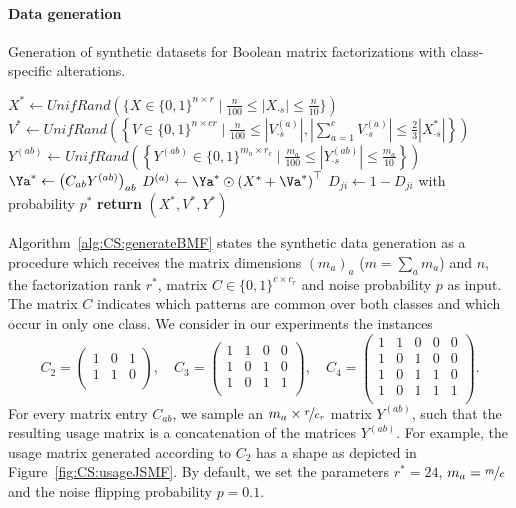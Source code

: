 \paragraph{Data generation}
\begin{algorithm}[t]
\caption{Generation of synthetic datasets for Boolean matrix factorizations with class-specific alterations.}
\begin{algorithmic}[1]
  	\State $X^*\gets UnifRand(\{X\in\{0,1\}^{n\times r}\mid \frac{n}{100}\leq|X_{\cdot s}|\leq \frac{n}{10}\})$
  	\State $\displaystyle V^*\gets UnifRand\left(\left\{V\in\{0,1\}^{n\times cr}\mid \frac{n}{100}\leq\left|V^{(a)}_{\cdot s}\right|, \left|\sum_{a=1}^cV^{(a)}_{\cdot s}\right|\leq \frac{2}{3}|X_{\cdot s}^*|\right\}\right)$
  	    \State ${Y^{(ab)}}\gets UnifRand\left(\left\{{Y^{(ab)}}\in\{0,1\}^{m_a\times r_c}\mid \frac{m_a}{100}\leq|Y^{(ab)}_{\cdot s}|\leq \frac{m_a}{10}\right\}\right)$
  	\EndFor
  	\State ${\Ya}^*\gets \left(C_{ab}Y^{(ab)}\right)_{ab}$
  	\State $D^{(a)}\gets {\Ya}^* \odot \left(X^*+{\Va}^*\right)^\top$ 
  	    \State $D_{ji}\gets 1-D_{ji}$ with probability $p^*$ 
    \EndFor
    \State \textbf{return} $(X^*,V^*,Y^*)$
  \EndFunction
\end{algorithmic}
\label{alg:CS:generateBMF}
\end{algorithm}
Algorithm~\ref{alg:CS:generateBMF} states the synthetic data generation as a procedure which receives the matrix dimensions $(m_a)_a$ ($m=\sum_am_a$) and $n$, the factorization rank $r^*$, matrix $C\in\{0,1\}^{c\times c_r}$ and noise probability $p$ as input. The matrix $C$ indicates which patterns are common over both classes and which occur in only one class. We consider in our experiments the instances
\[C_2=
\begin{pmatrix}
1 & 0 & 1\\
1 & 1 & 0\\
\end{pmatrix},\quad 
C_3=\begin{pmatrix}
1 & 1 & 0 & 0\\
1 & 0 & 1 & 0\\
1& 0 & 1 & 1\\
\end{pmatrix},\quad
C_4=\begin{pmatrix}
1 & 1 & 0 & 0 & 0\\
1 & 0 & 1 & 0 & 0\\
1 & 0 & 1 & 1 & 0\\
1 & 0 & 1 & 1 & 1\\
\end{pmatrix}.\]
For every matrix entry $C_{ab}$, we sample an $m_a\times \nicefrac{r}{c_r}$ matrix $Y^{(ab)}$, such that the resulting usage matrix is a concatenation of the matrices $Y^{(ab)}$. For example, the usage matrix generated according to $C_2$ has a shape as depicted in Figure~\ref{fig:CS:usageJSMF}.
By default, we set the parameters $r^*=24$, $m_a=\nicefrac{m}{c}$ and the noise flipping probability $p=0.1$.

